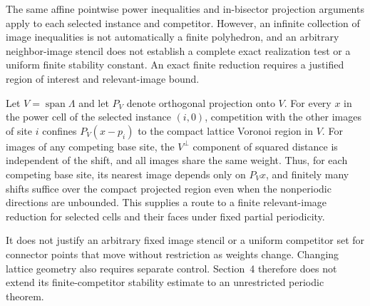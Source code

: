 The same affine pointwise power inequalities and in-bisector projection arguments apply to each selected instance and competitor. However, an infinite collection of image inequalities is not automatically a finite polyhedron, and an arbitrary neighbor-image stencil does not establish a complete exact realization test or a uniform finite stability constant. An exact finite reduction requires a justified region of interest and relevant-image bound.

Let $V=\operatorname{span}\Lambda$ and let $P_V$ denote orthogonal projection onto $V$. For every $x$ in the power cell of the selected instance $(i,0)$, competition with the other images of site $i$ confines $P_V(x-p_i)$ to the compact lattice Voronoi region in $V$. For images of any competing base site, the $V^\perp$ component of squared distance is independent of the shift, and all images share the same weight. Thus, for each competing base site, its nearest image depends only on $P_Vx$, and finitely many shifts suffice over the compact projected region even when the nonperiodic directions are unbounded. This supplies a route to a finite relevant-image reduction for selected cells and their faces under fixed partial periodicity.

It does not justify an arbitrary fixed image stencil or a uniform competitor set for connector points that move without restriction as weights change. Changing lattice geometry also requires separate control. Section~4 therefore does not extend its finite-competitor stability estimate to an unrestricted periodic theorem.
